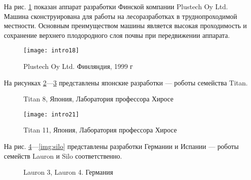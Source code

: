 На рис. \ref{img:Plustech} показан аппарат разработки Финской компании Plustech Oy Ltd. Машина сконструирована для работы на лесоразработках в труднопроходимой местности. Основным преимуществом машины является высокая проходимость и сохранение верхнего плодородного слоя почвы при передвижении аппарата.

\begin{figure}[h]
\centering
\texttt{[image: intro18]}
\caption{Plustech Oy Ltd. Финляндия, 1999 г}
\label{img:Plustech}
\end{figure}

На рисунках \ref{img:titan}---\ref{img:titan2} представлены японские разработки --- роботы семейства Titan.

\begin{figure}[h]
  \begin{minipage}[h]{0.49\linewidth}
  \end{minipage}
  \hfill
  \begin{minipage}[h]{0.49\linewidth}
  \end{minipage}
  \caption{Titan 8, Япония, Лаборатория профессора Хиросе}
  \label{img:titan}  
\end{figure}

\begin{figure}[h]
\centering
\texttt{[image: intro21]}
\caption{Titan 11, Япония, Лаборатория профессора Хиросе}
\label{img:titan2}
\end{figure}

На рис. \ref{img:lauron}---\ref{img:silo} представлены разработки Германии и Испании --- роботы семейств Lauron и Silo соответственно.

\begin{figure}[h]
  \begin{minipage}[h]{0.49\linewidth}
  \end{minipage}
  \hfill
  \begin{minipage}[h]{0.49\linewidth}
  \end{minipage}
  \caption{Lauron 3, Lauron 4. Германия}
  \label{img:lauron}
\end{figure}

